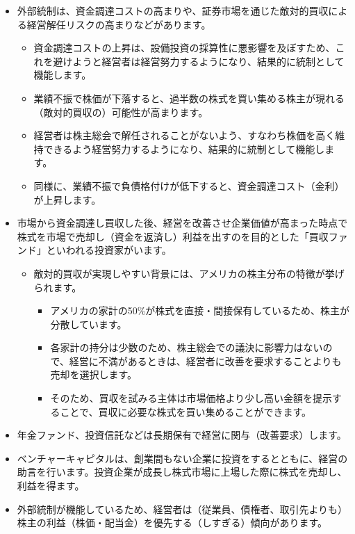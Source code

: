 \documentclass[
]{book}
\begin{document}
\begin{itemize}
\item
  外部統制は、資金調達コストの高まりや、証券市場を通じた敵対的買収による経営解任リスクの高まりなどがあります。

  \begin{itemize}
  \item
    資金調達コストの上昇は、設備投資の採算性に悪影響を及ぼすため、これを避けようと経営者は経営努力するようになり、結果的に統制として機能します。
  \item
    業績不振で株価が下落すると、過半数の株式を買い集める株主が現れる（敵対的買収の）可能性が高まります。
  \item
    経営者は株主総会で解任されることがないよう、すなわち株価を高く維持できるよう経営努力するようになり、結果的に統制として機能します。
  \item
    同様に、業績不振で負債格付けが低下すると、資金調達コスト（金利）が上昇します。
  \end{itemize}
\item
  市場から資金調達し買収した後、経営を改善させ企業価値が高まった時点で株式を市場で売却し（資金を返済し）利益を出すのを目的とした「買収ファンド」といわれる投資家がいます。

  \begin{itemize}
  \item
    敵対的買収が実現しやすい背景には、アメリカの株主分布の特徴が挙げられます。

    \begin{itemize}
    \item
      アメリカの家計の50\%が株式を直接・間接保有しているため、株主が分散しています。
    \item
      各家計の持分は少数のため、株主総会での議決に影響力はないので、経営に不満があるときは、経営者に改善を要求することよりも売却を選択します。
    \item
      そのため、買収を試みる主体は市場価格より少し高い金額を提示することで、買収に必要な株式を買い集めることができます。
    \end{itemize}
  \end{itemize}
\item
  年金ファンド、投資信託などは長期保有で経営に関与（改善要求）します。
\item
  ベンチャーキャピタルは、創業間もない企業に投資をするとともに、経営の助言を行います。投資企業が成長し株式市場に上場した際に株式を売却し、利益を得ます。
\item
  外部統制が機能しているため、経営者は（従業員、債権者、取引先よりも）株主の利益（株価・配当金）を優先する（しすぎる）傾向があります。


\end{itemize}
\end{document}
